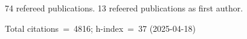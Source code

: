 74 refereed publications. 13 refeered publications as first author.

Total citations~=~4816; h-index~=~37 (2025-04-18)
